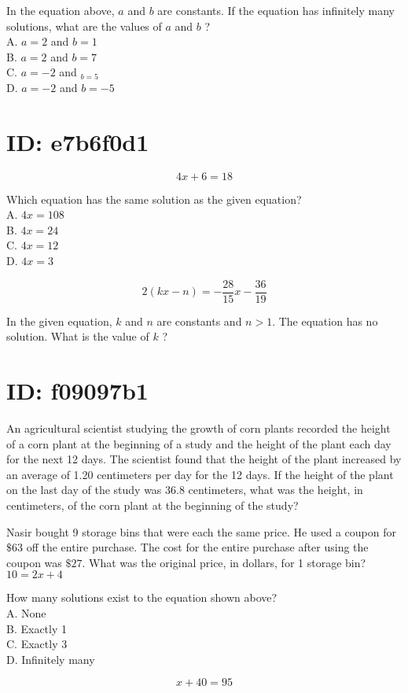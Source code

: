 In the equation above, $a$ and $b$ are constants. If the equation has infinitely many solutions, what are the values of $a$ and $b$ ?\\
A. $a=2$ and $b=1$\\
B. $a=2$ and $b=7$\\
C. $a=-2$ and $_{b=5}$\\
D. $a=-2$ and $b=-5$

\section*{ID: e7b6f0d1}
$$
4 x+6=18
$$

Which equation has the same solution as the given equation?\\
A. $4 x=108$\\
B. $4 x=24$\\
C. $4 x=12$\\
D. $4 x=3$

$$
2(k x-n)=-\frac{28}{15} x-\frac{36}{19}
$$

In the given equation, $k$ and $n$ are constants and $n>1$. The equation has no solution. What is the value of $k$ ?

\section*{ID: f09097b1}
An agricultural scientist studying the growth of corn plants recorded the height of a corn plant at the beginning of a study and the height of the plant each day for the next 12 days. The scientist found that the height of the plant increased by an average of 1.20 centimeters per day for the 12 days. If the height of the plant on the last day of the study was 36.8 centimeters, what was the height, in centimeters, of the corn plant at the beginning of the study?

Nasir bought 9 storage bins that were each the same price. He used a coupon for $\$ 63$ off the entire purchase. The cost for the entire purchase after using the coupon was $\$ 27$. What was the original price, in dollars, for 1 storage bin?\\
$10=2 x+4$

How many solutions exist to the equation shown above?\\
A. None\\
B. Exactly 1\\
C. Exactly 3\\
D. Infinitely many

$$
x+40=95
$$

